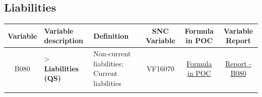 \documentclass[]{book}
\begin{document}
\hypertarget{liabilities}{%
\subsection{Liabilities}\label{liabilities}}

\begin{longtable}[]{@{}cllccc@{}}
\toprule
\begin{minipage}[b]{0.08\columnwidth}\centering
Variable\strut
\end{minipage} & \begin{minipage}[b]{0.20\columnwidth}\raggedright
Variable description\strut
\end{minipage} & \begin{minipage}[b]{0.16\columnwidth}\raggedright
Definition\strut
\end{minipage} & \begin{minipage}[b]{0.09\columnwidth}\centering
SNC Variable\strut
\end{minipage} & \begin{minipage}[b]{0.15\columnwidth}\centering
Formula in POC\strut
\end{minipage} & \begin{minipage}[b]{0.16\columnwidth}\centering
Variable Report\strut
\end{minipage}\tabularnewline
\midrule
\endhead
\begin{minipage}[t]{0.08\columnwidth}\centering
B080\strut
\end{minipage} & \begin{minipage}[t]{0.20\columnwidth}\raggedright
\textgreater{} \textbf{Liabilities (QS)}\strut
\end{minipage} & \begin{minipage}[t]{0.16\columnwidth}\raggedright
Non-current liabilities; Current liabilities\strut
\end{minipage} & \begin{minipage}[t]{0.09\columnwidth}\centering
VF16070\strut
\end{minipage} & \begin{minipage}[t]{0.15\columnwidth}\centering
\protect\hyperlink{b080---formula-in-poc}{Formula in POC}\strut
\end{minipage} & \begin{minipage}[t]{0.16\columnwidth}\centering
\href{./Auxiliary\%20Files/technical_reports/variable_report/B080(!).pdf}{Report - B080}\strut
\end{minipage}\tabularnewline
\begin{minipage}[t]{0.08\columnwidth}\centering

\end{minipage}
\end{longtable}
\end{document}
